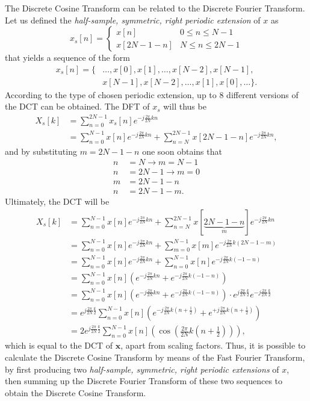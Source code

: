 \documentclass[\documentfontsize, twocolumn]{\classname}
\begin{document}
The Discrete Cosine Transform can be related to the Discrete Fourier Transform. Let us defined the \emph{half-sample, symmetric, right periodic extension} of $x$ as
\[
    x_s[n] =
    \left\{
        \begin{array}{ll}
            x[n] & 0 \leq n \leq N-1\\
            x[2N - 1 - n] & N \leq n \leq 2N-1
        \end{array}
    \right.
\]
that yields a sequence of the form
\begin{align*}
    x_s[n] = \{ &\dots, x[0], x[1],\dots,x[N-2], x[N-1],\\ 
                &x[N-1], x[N-2],\dots,x[1],x[0],\dots\}.
\end{align*}
According to the type of chosen periodic extension, up to $8$ different versions of the DCT can be obtained. The DFT of $x_s$ will thus be
\begin{align*}
    X_s[k] 
    &= \sum_{n=0}^{2N-1} x_s[n] e^{-j\frac{2\pi}{2N}kn}\\
    &= \sum_{n=0}^{N-1} x[n] e^{-j\frac{2\pi}{2N}kn} + \sum_{n=N}^{2N-1} x[2N - 1 - n] e^{-j\frac{2\pi}{2N}kn},
\end{align*}
and by substituting $m = 2N-1-n$ one soon obtains that
\begin{align*}
    n &= N  \rightarrow  m = N - 1 \\
    n &= 2N - 1  \rightarrow  m = 0 \\
    m &= 2N - 1 - n\\
    n &= 2N - 1 - m.
\end{align*}
Ultimately, the DCT will be
\begin{align*}
    X_s[k] 
    &= \sum_{n=0}^{N-1} x[n] e^{-j\frac{2\pi}{2N}kn} + \sum_{n=N}^{2N-1} x[\underbrace{2N - 1 - n}_{m}] e^{-j\frac{2\pi}{2N}kn}\\
    &= \sum_{n=0}^{N-1} x[n] e^{-j\frac{2\pi}{2N}kn} + \sum_{m=0}^{N-1} x[m] e^{-j\frac{2\pi}{2N}k(2N-1-m)}\\
    &= \sum_{n=0}^{N-1} x[n] e^{-j\frac{2\pi}{2N}kn} + \sum_{n=0}^{N-1} x[n] e^{-j\frac{2\pi}{2N}k(-1-n)}\\
    &= \sum_{n=0}^{N-1} x[n]\left(e^{-j\frac{2\pi}{2N}kn} + e^{-j\frac{2\pi}{2N}k(-1-n)}\right) \\
    &= \sum_{n=0}^{N-1} x[n]\left(e^{-j\frac{2\pi}{2N}kn} + e^{-j\frac{2\pi}{2N}k(-1-n)}\right) \cdot e^{j\frac{2\pi}{2N}\frac{k}{2}} e^{-j\frac{2\pi}{2N}\frac{k}{2}}\\
    &= e^{j\frac{2\pi}{2N}\frac{k}{2}} \sum_{n=0}^{N-1} x[n]\left(e^{-j\frac{2\pi}{2N}k(n + \frac 1 2)} + e^{+j\frac{2\pi}{2N}k(n + \frac 1 2)}\right)\\
    &= 2e^{j\frac{2\pi}{2N}\frac{k}{2}} \sum_{n=0}^{N-1} x[n]\left(\cos{(\frac{2\pi}{2N}k(n + \frac 1 2))}\right),
\end{align*}
which is equal to the DCT of $\bm x$, apart from scaling factors. Thus, it is possible to calculate the Discrete Cosine Transform by means of the Fast Fourier Transform, by first producing two \emph{half-sample, symmetric, right periodic extensions} of $x$, then summing up the Discrete Fourier Transform of these two sequences to obtain the Discrete Cosine Transform.
\end{document}

